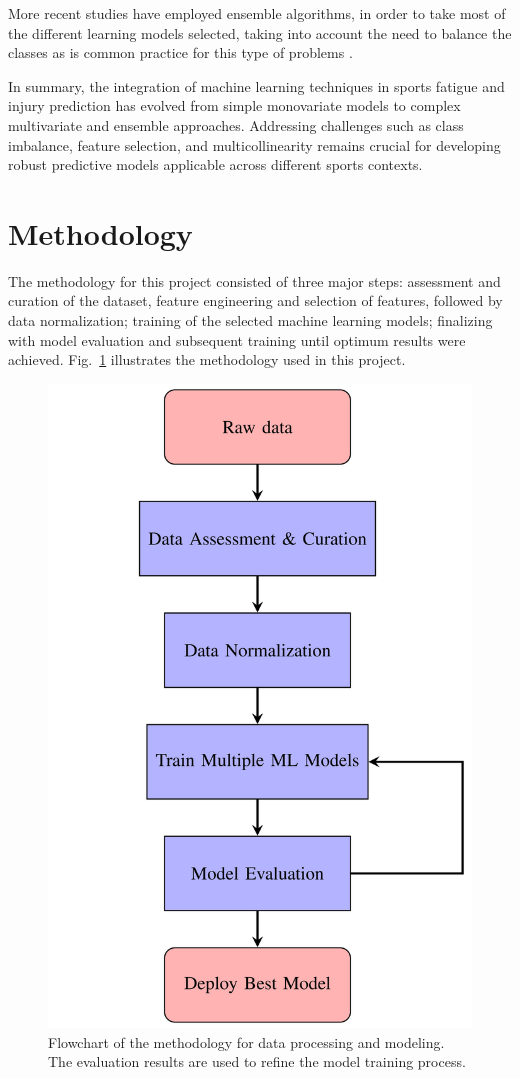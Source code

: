 \documentclass[conference]{IEEEtran}
\begin{document}
More recent studies have employed ensemble algorithms, in order to take most of the different learning models selected, taking into account the need to balance the classes as is common practice for this type of problems \cite{lopez2018preventive}. 

In summary, the integration of machine learning techniques in sports fatigue and injury prediction has evolved from simple monovariate models to complex multivariate and ensemble approaches. Addressing challenges such as class imbalance, feature selection, and multicollinearity remains crucial for developing robust predictive models applicable across different sports contexts.

\section{Methodology}

The methodology for this project consisted of three major steps: assessment and curation of the dataset, feature engineering and selection of features, followed by data normalization; training of the selected machine learning models; finalizing with model evaluation and subsequent training until optimum results were achieved. Fig.~\ref{fig:methodology} illustrates the methodology used in this project.

\begin{figure}[h]
\centering
\includegraphics[width=0.72\linewidth]{assets/fluxog.png}
\caption{Flowchart of the methodology for data processing and modeling. The evaluation results are used to refine the model training process.}
\label{fig:methodology}
\end{figure}
\end{document}
